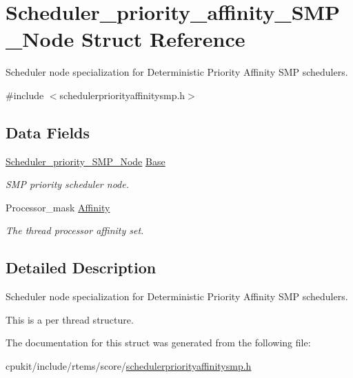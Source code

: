 \hypertarget{structScheduler__priority__affinity__SMP__Node}{}\section{Scheduler\+\_\+priority\+\_\+affinity\+\_\+\+S\+M\+P\+\_\+\+Node Struct Reference}
\label{structScheduler__priority__affinity__SMP__Node}


Scheduler node specialization for Deterministic Priority Affinity S\+MP schedulers.  




{\ttfamily \#include $<$schedulerpriorityaffinitysmp.\+h$>$}

\subsection*{Data Fields}
\begin{DoxyCompactItemize}
\item 
\mbox{\label{structScheduler__priority__affinity__SMP__Node_a19cfac09264c199d60ce0f68feebe45f}} 
\mbox{\hyperlink{structScheduler__priority__SMP__Node}{Scheduler\+\_\+priority\+\_\+\+S\+M\+P\+\_\+\+Node}} \mbox{\hyperlink{structScheduler__priority__affinity__SMP__Node_a19cfac09264c199d60ce0f68feebe45f}{Base}}
\begin{DoxyCompactList}\small\item\em S\+MP priority scheduler node. \end{DoxyCompactList}\item 
\mbox{\label{structScheduler__priority__affinity__SMP__Node_a62c5390394e09c03762d29caa05b6cf2}} 
Processor\+\_\+mask \mbox{\hyperlink{structScheduler__priority__affinity__SMP__Node_a62c5390394e09c03762d29caa05b6cf2}{Affinity}}
\begin{DoxyCompactList}\small\item\em The thread processor affinity set. \end{DoxyCompactList}\end{DoxyCompactItemize}


\subsection{Detailed Description}
Scheduler node specialization for Deterministic Priority Affinity S\+MP schedulers. 

This is a per thread structure. 

The documentation for this struct was generated from the following file\+:\begin{DoxyCompactItemize}
\item 
cpukit/include/rtems/score/\mbox{\hyperlink{schedulerpriorityaffinitysmp_8h}{schedulerpriorityaffinitysmp.\+h}}\end{DoxyCompactItemize}
